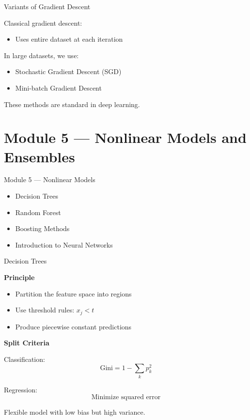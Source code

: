 \documentclass{beamer}
\begin{document}
\begin{frame}{Variants of Gradient Descent}

Classical gradient descent:

\begin{itemize}
    \item Uses entire dataset at each iteration
\end{itemize}

\vspace{0.5cm}

In large datasets, we use:

\begin{itemize}
    \item Stochastic Gradient Descent (SGD)
    \item Mini-batch Gradient Descent
\end{itemize}

\vspace{0.5cm}

These methods are standard in deep learning.

\end{frame}
\section{Module 5 — Nonlinear Models and Ensembles}

\begin{frame}{Module 5 — Nonlinear Models}
\begin{itemize}
    \item Decision Trees
    \item Random Forest
    \item Boosting Methods
    \item Introduction to Neural Networks
\end{itemize}
\end{frame}

\begin{frame}{Decision Trees}

\textbf{Principle}

\begin{itemize}
    \item Partition the feature space into regions
    \item Use threshold rules: $x_j < t$
    \item Produce piecewise constant predictions
\end{itemize}

\vspace{0.4cm}

\textbf{Split Criteria}

Classification:
\[
\text{Gini} = 1 - \sum_k p_k^2
\]

Regression:
\[
\text{Minimize squared error}
\]

\vspace{0.3cm}

Flexible model with low bias but high variance.

\end{frame}
\end{document}
